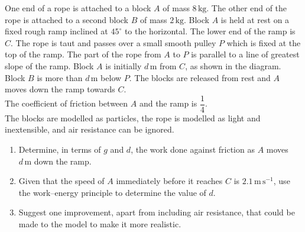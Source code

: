 \documentclass[leqno]{article}
\begin{document}
\begin{enumerate}[
  label=\textbf{\arabic*.},
  leftmargin=*,
  topsep=0pt,
  partopsep=0pt,
  parsep=0pt
]
\begin{figure}[H]
\end{figure}


One end of a rope is attached to a block $A$ of mass $8\,\mathrm{kg}$. The other end of the rope is attached to a second block $B$ of mass $2\,\mathrm{kg}$. Block $A$ is held at rest on a fixed rough ramp inclined at $45^\circ$ to the horizontal. The lower end of the ramp is $C$. The rope is taut and passes over a small smooth pulley $P$ which is fixed at the top of the ramp. The part of the rope from $A$ to $P$ is parallel to a line of greatest slope of the ramp. Block $A$ is initially $d\,\mathrm{m}$ from $C$, as shown in the diagram. \\

Block $B$ is more than $d\,\mathrm{m}$ below $P$. The blocks are released from rest and $A$ moves down the ramp towards $C$. \\

The coefficient of friction between $A$ and the ramp is $\dfrac{1}{4}$. \\

The blocks are modelled as particles, the rope is modelled as light and inextensible, and air resistance can be ignored. \\

\begin{enumerate}[label=\textbf{(\alph*)}]
  \item Determine, in terms of $g$ and $d$, the work done against friction as $A$ moves $d\,\mathrm{m}$ down the ramp.  \\
  \item Given that the speed of $A$ immediately before it reaches $C$ is $2.1\,\mathrm{m\,s^{-1}}$, use the work--energy principle to determine the value of $d$.  \\
  \item Suggest one improvement, apart from including air resistance, that could be made to the model to make it more realistic.  \\
\end{enumerate}


\end{enumerate}
\end{document}
